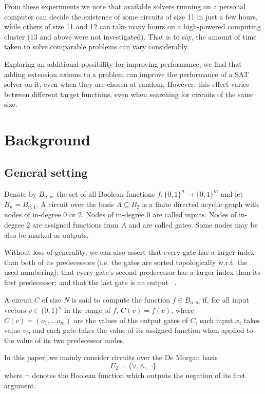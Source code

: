 \documentclass{article}
\begin{document}
From these experiments we note that available solvers running on a personal computer can decide the existence of some circuits of size 11 in just a few hours, while others of size 11 and 12 can take many hours on a high-powered computing cluster (13 and above were not investigated). That is to say, the amount of time taken to solve comparable problems can vary considerably.

Exploring an additional possibility for improving performance, we find that adding extension axioms to a problem can improve the performance of a SAT solver on it, even when they are chosen at random. However, this effect varies between different target functions, even when searching for circuits of the same size.

\section{Background}

\subsection{General setting}

Denote by \(B_{n,m}\) the set of all Boolean functions \(f: \{0,1\}^n \to \{0,1\}^m\) and let \(B_n = B_{n,1}\). A circuit over the basis \(A \subseteq B_2\) is a finite directed acyclic graph with nodes of in-degree 0 or 2. Nodes of in-degree 0 are called inputs. Nodes of in-degree 2 are assigned functions from \(A\) and are called gates. Some nodes may be also be marked as outputs.

Without loss of generality, we can also assert that every gate has a larger index than both of its predecessors (i.e. the gates are sorted topologically w.r.t. the used numbering); that every gate's second predecessor has a larger index than its first predecessor; and that the last gate is an output ~\cite{kulikov}.

A circuit \(C\) of size $N$ is said to compute the function \(f\in B_{n,m}\) if, for all input vectors \(v\in\{0,1\}^n\) in the range of \(f\), \(C(v)=f(v)\), where \(C(v) = (o_1,...o_m)\) are the values of the output gates of \(C\), each input \(x_i\) takes value \(v_i\), and each gate takes the value of its assigned function when applied to the value of its two predecessor nodes.

In this paper, we mainly consider circuits over the De Morgan basis \[U_2 = \{\lor, \land, \neg\}\] where \(\neg\) denotes the Boolean function which outputs the negation of its first argument.
\end{document}
